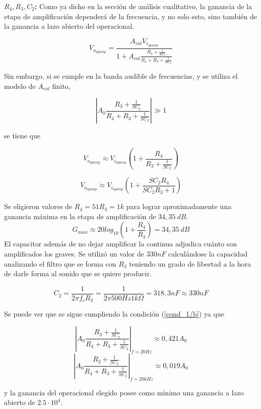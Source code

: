 \textbf{$R_4, R_3, C_2$:} Como ya dicho en la sección de análisis cualitativo, la ganancia de la etapa de amplificación dependerá de la frecuencia, y no solo esto, sino también de la ganancia a lazo abierto del operacional.

\begin{equation}
	V_{o_{opamp}} = \frac{A_{vol} V_{i_{opamp}}}{1+A_{vol} \frac{R_3 + \frac{1}{SC_2}}{R_4 + R_3 + \frac{1}{SC_2}}}
\end{equation}

Sin embargo, si se cumple en la banda audible de frecuencias, y se utiliza el modelo de $A_{vol}$ finito,

\begin{equation}
\left| A_{0}\frac{R_3 + \frac{1}{SC_2}}{R_4 + R_3 + \frac{1}{SC_2}} \right| \gg 1
\label{cond_1/b}
\end{equation}

se tiene que

\begin{equation}
V_{o_{opamp}} \approx V_{i_{opamp}}\left( 1 + \frac{R_4}{R_3 + \frac{1}{SC_2}}  \right)
\end{equation}

\begin{equation}
	V_{o_{opamp}} \approx V_{i_{opamp}}\left( 1 + \frac{SC_2R_4}{SC_2R_3 + 1}  \right)
\end{equation}

Se eligieron valores de $R_4=51R_3=1k$ para lograr aproximadamente una ganancia máxima en la etapa de amplificación de $34,35 \ dB$.
\[G_{max} \approx 20log_{10}(1+\frac{R_4}{R_3}) = 34,35 \ dB\]
El capacitor además de no dejar amplificar la continua adjudica cuánto son amplificados los graves. Se utilizó un valor de $330nF$ calculándose la capacidad analizando el filtro que se forma con $R_3$ teniendo un grado de libertad a la hora de darle forma al sonido que se quiere producir.

\[ C_2 = \frac{1}{2\pi f_c R_3} = \frac{1}{2\pi 500Hz 1k\Omega} = 318,3nF \approx 330nF \]

Se puede ver que se sigue cumpliendo la condición (\ref{cond_1/b}) ya que

$$ \left| A_{0}\frac{R_3 + \frac{1}{SC_2}}{R_4 + R_3 + \frac{1}{SC_2}} \right|_{f=20Hz} \approx 0,421A_0 $$
$$ \left| A_{0}\frac{R_3 + \frac{1}{SC_2}}{R_4 + R_3 + \frac{1}{SC_2}} \right|_{f=20kHz} \approx 0,019A_0 $$

y la ganancia del operacional elegido posee como mínimo una ganancia a lazo abierto de $2.5 \cdot 10^4$.

